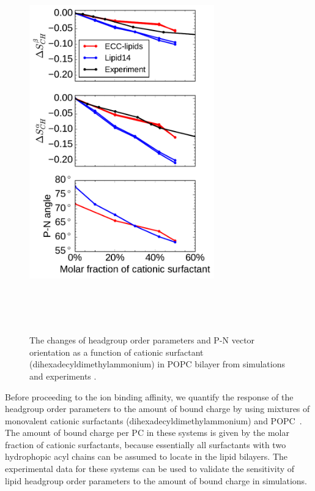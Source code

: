 \documentclass[aip,jcp,twocolumn]{revtex4}
\begin{document}
\begin{figure}[tbp]
  \centering
  \includegraphics[width=8.0cm]{../Fig/ipython_nb/PN_angle_OrdPars-A-B_L14-ECCL17_q80_sig89_surf.pdf}
  \caption{\label{OrderParameterCHANGESsurf}
    The changes of headgroup order parameters and P-N vector orientation as a function of
    cationic surfactant (dihexadecyldimethylammonium) in POPC bilayer from simulations
    and experiments \cite{scherer89}.
  }
   \\
   \\
   \\
\end{figure}

Before proceeding to the ion binding affinity, we quantify
the response of the headgroup order parameters to the amount of 
bound charge by using mixtures of monovalent cationic
surfactants (dihexadecyldimethylammonium)
and POPC~\cite{scherer89}. The amount of bound charge per PC 
in these systems is given by the molar fraction of cationic 
surfactants, because essentially all surfactants with two hydrophopic
acyl chains can be assumed to locate in the lipid bilayers.
The experimental data for these systems can be used to validate 
the sensitivity of lipid headgroup order parameters
to the amount of bound charge in simulations.
\end{document}
